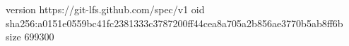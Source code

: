 version https://git-lfs.github.com/spec/v1
oid sha256:a0151e0559bc41fc2381333c3787200ff44cea8a705a2b856ae3770b5ab8ff6b
size 699300
